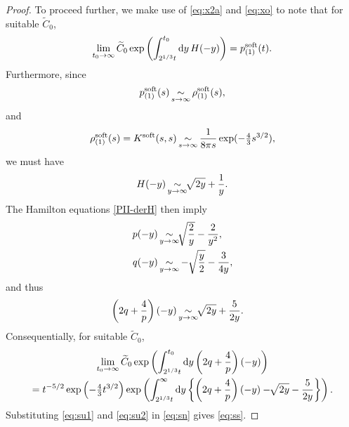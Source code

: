 \documentclass[10pt,reqno]{amsart}
\theoremstyle{plain}
\theoremstyle{definition}
\theoremstyle{remark}
\begin{document}
\begin{proof}
To proceed further, we make use of \eqref{eq:x2a} and \eqref{eq:xo} to note that for suitable $\widetilde{C}_0$,
\begin{align}
\lim_{t_0\rightarrow \infty} \widetilde{C}_0 \exp \left(\int_{2^{1/3}t}^{t_0} {\rm d}y \, H(-y) \right) = p_{(1)}^{{\rm soft}}(t).   
\label{eq:su1}
\end{align}
Furthermore, since 
\begin{align}
   p_{(1)}^{{\rm soft}}(s)  \mathop{\sim}_{s \rightarrow \infty} \rho_{(1)}^{{\rm soft}}(s) ,
\label{eq:sf}
\end{align}
and
\begin{align}
\rho_{(1)}^{{\rm soft}}(s) =K^{{\rm soft}}(s,s) \mathop{\sim}_{s \rightarrow \infty} \frac{1}{8 \pi s} \exp(-\tfrac{4}{3}s^{3/2}) ,
\label{eq:sf1}
\end{align}
we must have
\begin{align}
H(-y) \mathop{\sim}_{y \rightarrow \infty} { \hspace{-0.5pt} \sqrt[]{{2y}}} + \frac{1}{y}.	 \label{eq:sf2}
\end{align}
The Hamilton equations \eqref{PII-derH} then imply
\begin{align}
p(-y) & \mathop{\sim}_{y \rightarrow \infty} { \hspace{-0.5pt} \sqrt[]{{\frac{2}{y}}}} - \frac{2}{y^2},	 
\label{eq:sf3} \\
q(-y) & \mathop{\sim}_{y \rightarrow \infty} -\; { \hspace{-0.5pt} \sqrt[]{{\frac{y}{2}}}} - \frac{3}{4y},      
\label{eq:sf4} 
\end{align}
and thus
\begin{align*}
\left( 2q + \frac{4}{p} \right) (-y) & \mathop{\sim}_{y \rightarrow \infty}  { \hspace{-0.5pt} \sqrt[]{{2y}}} + \frac{5}{2y}.     
\end{align*}
Consequentially, for suitable $\widetilde{C}_0$, 
\begin{multline}
\lim_{t_0 \rightarrow \infty} \widetilde{C}_0 \exp \left( \int_{2^{1/3}t}^{t_0} {\rm d}y \left( 2q + \frac{4}{p} \right) (-y) \right)
\\
  =  t^{-5/2} \exp \left(-\tfrac{4}{3}t^{3/2} \right)  \exp \left( \int_{2^{1/3}t}^{\infty} {\rm d}y \left\{ \left( 2q + \frac{4}{p} \right)(-y)-{ \hspace{-0.5pt} \sqrt[]{{2y}}}-\frac{5}{2y} \right\} \right) .
\label{eq:su2}
\end{multline}
Substituting \eqref{eq:su1} and \eqref{eq:su2} in \eqref{eq:sn} gives \eqref{eq:ss}.
\end{proof}
\end{document}
